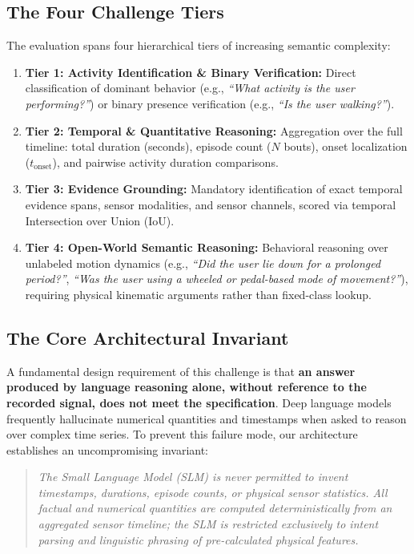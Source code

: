 \documentclass[11pt,a4paper]{article}
\begin{document}
\subsection{The Four Challenge Tiers}
The evaluation spans four hierarchical tiers of increasing semantic complexity:
\begin{enumerate}[leftmargin=1.5em,noitemsep,topsep=2pt]
  \item \textbf{Tier 1: Activity Identification \& Binary Verification:} Direct classification of dominant behavior (e.g., \textit{``What activity is the user performing?''}) or binary presence verification (e.g., \textit{``Is the user walking?''}).
  \item \textbf{Tier 2: Temporal \& Quantitative Reasoning:} Aggregation over the full timeline: total duration (seconds), episode count ($N$ bouts), onset localization ($t_{\text{onset}}$), and pairwise activity duration comparisons.
  \item \textbf{Tier 3: Evidence Grounding:} Mandatory identification of exact temporal evidence spans, sensor modalities, and sensor channels, scored via temporal Intersection over Union ($\text{IoU}$).
  \item \textbf{Tier 4: Open-World Semantic Reasoning:} Behavioral reasoning over unlabeled motion dynamics (e.g., \textit{``Did the user lie down for a prolonged period?''}, \textit{``Was the user using a wheeled or pedal-based mode of movement?''}), requiring physical kinematic arguments rather than fixed-class lookup.
\end{enumerate}

\subsection{The Core Architectural Invariant}
A fundamental design requirement of this challenge is that \textbf{an answer produced by language reasoning alone, without reference to the recorded signal, does not meet the specification}. Deep language models frequently hallucinate numerical quantities and timestamps when asked to reason over complex time series. To prevent this failure mode, our architecture establishes an uncompromising invariant:
\begin{quote}
  \textit{The Small Language Model (SLM) is never permitted to invent timestamps, durations, episode counts, or physical sensor statistics. All factual and numerical quantities are computed deterministically from an aggregated sensor timeline; the SLM is restricted exclusively to intent parsing and linguistic phrasing of pre-calculated physical features.}
\end{quote}
\end{document}
